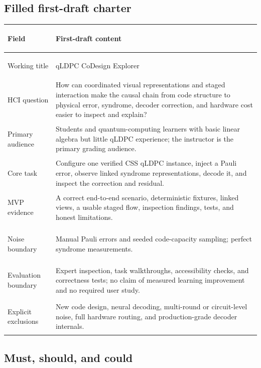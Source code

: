 \documentclass[11pt]{article}
\begin{document}
\subsection{Filled first-draft charter}

\begin{center}
\begin{tabularx}{\textwidth}{>{\bfseries\raggedright\arraybackslash}p{}X}
\toprule
Field & First-draft content \\
\midrule
Working title & qLDPC CoDesign Explorer \\
HCI question & How can coordinated visual representations and staged interaction make the causal
chain from code structure to physical error, syndrome, decoder correction, and hardware cost easier
to inspect and explain? \\
Primary audience & Students and quantum-computing learners with basic linear algebra but little
qLDPC experience; the instructor is the primary grading audience. \\
Core task & Configure one verified CSS qLDPC instance, inject a Pauli error, observe linked syndrome
representations, decode it, and inspect the correction and residual. \\
MVP evidence & A correct end-to-end scenario, deterministic fixtures, linked views, a usable staged
flow, inspection findings, tests, and honest limitations. \\
Noise boundary & Manual Pauli errors and seeded code-capacity sampling; perfect syndrome measurements. \\
Evaluation boundary & Expert inspection, task walkthroughs, accessibility checks, and correctness
tests; no claim of measured learning improvement and no required user study. \\
Explicit exclusions & New code design, neural decoding, multi-round or circuit-level noise, full
hardware routing, and production-grade decoder internals. \\
\bottomrule
\end{tabularx}
\end{center}

\subsection{Must, should, and could}
\end{document}
